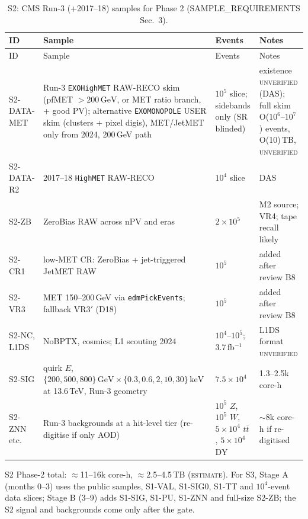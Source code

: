 \documentclass[11pt,a4paper]{article}
\newcommand{\EST}{\textsc{estimate}}
\newcommand{\UNV}{\textsc{unverified}}
\newcommand{\GeV}{\,\mathrm{GeV}}
\newcommand{\keV}{\,\mathrm{keV}}
\begin{document}
{\small
\begin{longtable}{@{}L{1.54cm}L{6.57cm}L{3.08cm}L{4.92cm}@{}}
\caption{S2: CMS Run-3 (+2017--18) samples for Phase 2 (SAMPLE\_REQUIREMENTS Sec.~3).}\label{tab:s2}\\
\toprule ID & Sample & Events & Notes\\\midrule\endfirsthead
\toprule ID & Sample & Events & Notes\\\midrule\endhead
\bottomrule\endfoot
S2-DATA-MET & Run-3 \texttt{EXOHighMET} RAW-RECO skim (pfMET $>200\GeV$, or MET ratio branch, + good PV); alternative \texttt{EXOMONOPOLE} USER skim (clusters + pixel digis), MET/JetMET only from 2024, 200\,GeV path & $10^5$ slice; sidebands only (SR blinded) & existence \UNV{} (DAS); full skim O($10^6$--$10^7$) events, O(10)\,TB, \UNV\\
S2-DATA-R2 & 2017--18 \texttt{HighMET} RAW-RECO & $10^4$ slice & DAS\\
S2-ZB & ZeroBias RAW across nPV and eras & $2\times10^5$ & M2 source; VR4; tape recall likely\\
S2-CR1 & low-MET CR: ZeroBias + jet-triggered JetMET RAW & $10^5$ & added after review B8\\
S2-VR3 & MET 150--200\,GeV via \texttt{edmPickEvents}; fallback VR3$'$ (D18) & $10^5$ & added after review B8\\
S2-NC, L1DS & NoBPTX, cosmics; L1 scouting 2024 & $10^4$--$10^5$; 3.7\,fb$^{-1}$ & L1DS format \UNV\\
S2-SIG & quirk $E$, $\{200,500,800\}\GeV\times\{0.3,0.6,2,10,30\}\keV$ at 13.6\,TeV, Run-3 geometry & $7.5\times10^4$ & 1.3--2.5k core-h\\
S2-ZNN etc. & Run-3 backgrounds at a hit-level tier (re-digitise if only AOD) & $10^5$ $Z$, $10^5$ $W$, $5\times10^4$ $t\bar t$, $5\times10^4$ DY & $\sim$8k core-h if re-digitised\\
\end{longtable}
}
S2 Phase-2 total: $\approx$11--16k core-h, $\approx$2.5--4.5\,TB (\EST). For S3, Stage A (months 0--3) uses the public samples, S1-VAL, S1-SIG0, S1-TT and $10^4$-event data slices; Stage B (3--9) adds S1-SIG, S1-PU, S1-ZNN and full-size S2-ZB; the S2 signal and backgrounds come only after the gate.
\end{document}

